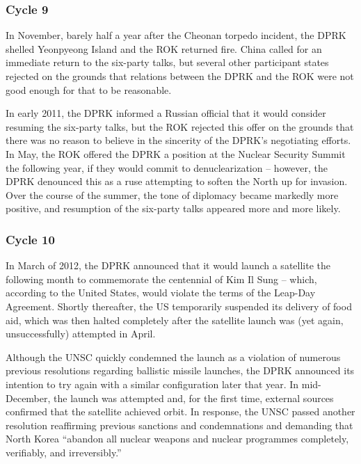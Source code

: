 \documentclass{article}
\begin{document}

\subsubsection{Cycle 9}

In November, barely half a year after the Cheonan torpedo incident, the DPRK shelled Yeonpyeong Island and the ROK returned fire\cite{bbc}. China called for an immediate return to the six-party talks\cite{bbc}, but several other participant states rejected on the grounds that relations between the DPRK and the ROK were not good enough for that to be reasonable\cite{davenport}.

In early 2011, the DPRK informed a Russian official that it would consider resuming the six-party talks, but the ROK rejected this offer on the grounds that there was no reason to believe in the sincerity of the DPRK’s negotiating efforts\cite{davenport}. In May, the ROK offered the DPRK a position at the Nuclear Security Summit the following year, if they would commit to denuclearization – however, the DPRK denounced this as a ruse attempting to soften the North up for invasion\cite{davenport}. Over the course of the summer, the tone of diplomacy became markedly more positive, and resumption of the six-party talks appeared more and more likely\cite{davenport}.

\subsubsection{Cycle 10}

In March of 2012, the DPRK announced that it would launch a satellite the following month to commemorate the centennial of Kim Il Sung – which, according to the United States, would violate the terms of the Leap-Day Agreement\cite{davenport}. Shortly thereafter, the US temporarily suspended its delivery of food aid, which was then halted completely after the satellite launch was (yet again, unsuccessfully) attempted in April\cite{davenport}.

Although the UNSC quickly condemned the launch as a violation of numerous previous resolutions regarding ballistic missile launches\cite{unsc12}, the DPRK announced its intention to try again with a similar configuration later that year. In mid-December, the launch was attempted and, for the first time, external sources confirmed that the satellite achieved orbit\cite{davenport}. In response, the UNSC passed another resolution reaffirming previous sanctions and condemnations and demanding that North Korea “abandon all nuclear weapons and nuclear programmes completely, verifiably, and irreversibly.” \cite{unsc13}
\end{document}
